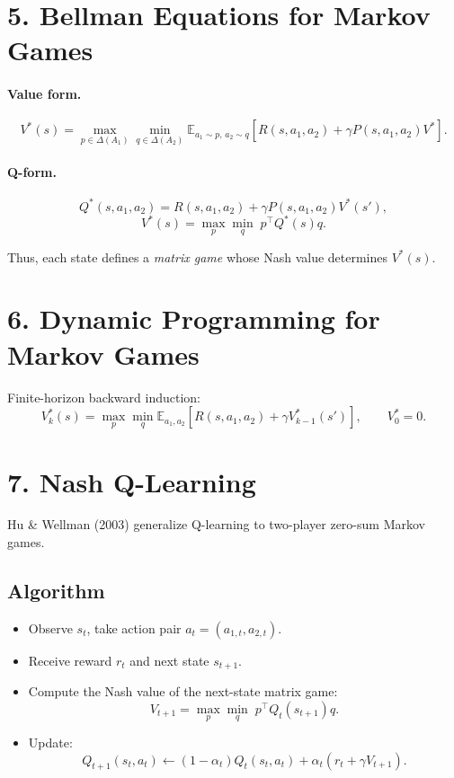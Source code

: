 \documentclass[12pt]{article}
\begin{document}
\section*{5. Bellman Equations for Markov Games}

\paragraph{Value form.}
\[
		V^*(s)
		=
		\max_{p \in \Delta(A_1)}
		\min_{q \in \Delta(A_2)}
		\mathbb{E}_{a_1\sim p,\,a_2\sim q}\left[
				R(s,a_1,a_2)
				+
				\gamma P(s,a_1,a_2)V^*
		\right].
\]

\paragraph{Q-form.}
\[
		Q^*(s,a_1,a_2) = R(s,a_1,a_2) + \gamma P(s,a_1,a_2)V^*(s'),
\]
\[
		V^*(s)
		=
		\max_{p}\min_{q} \; p^\top Q^*(s) q.
\]

Thus, each state defines a \emph{matrix game} whose Nash value determines $V^*(s)$.

\section*{6. Dynamic Programming for Markov Games}

Finite-horizon backward induction:
\[
		V^*_k(s)
		=
		\max_p \min_q \mathbb{E}_{a_1,a_2}[R(s,a_1,a_2) + \gamma V^*_{k-1}(s')],
		\qquad V^*_0 = 0.
\]

\section*{7. Nash Q-Learning}

Hu \& Wellman (2003) generalize Q-learning to two-player zero-sum Markov games.

\subsection*{Algorithm}
\begin{itemize}
		\item Observe $s_t$, take action pair $a_t=(a_{1,t},a_{2,t})$.
		\item Receive reward $r_t$ and next state $s_{t+1}$.
		\item Compute the Nash value of the next-state matrix game:
    \[
						V_{t+1} = \max_p \min_q \; p^\top Q_t(s_{t+1}) q.
    \]
		\item Update:
    \[
						Q_{t+1}(s_t,a_t)
						\leftarrow
						(1-\alpha_t) Q_t(s_t,a_t)
						+ \alpha_t \left(r_t + \gamma V_{t+1}\right).
    \]
\end{itemize}
\end{document}
